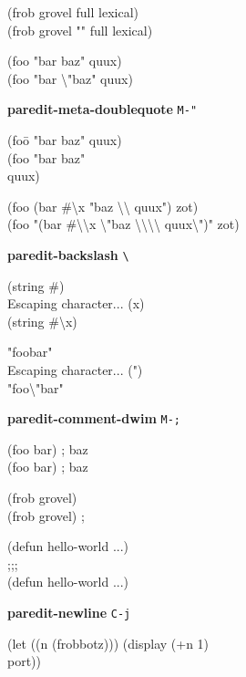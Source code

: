 \documentclass[10pt,landscape,a4paper]{article}
\newenvironment{nstabbing}
  {\setlength{\topsep}{-\parskip}%
   \setlength{\partopsep}{0.2em}%
   \tabbing}
  {\endtabbing}
\begin{document}
\begin{multicols}{4}
{\ttfamily
(frob grovel \cursor full lexical)\\
(frob grovel "\cursor " full lexical)

(foo "bar \cursor baz" quux)\\
(foo "bar \textbackslash"\cursor baz" quux)
}

\textbf{paredit-meta-doublequote} \texttt{M-"}

{\ttfamily
\begin{nstabbing}
(foo\={} "bar \cursor baz" quux)\\
(foo "bar baz"\\
\>\cursor quux)
\end{nstabbing}

(foo \cursor(bar \#\textbackslash x "baz \textbackslash\textbackslash{} quux") zot)\\
(foo "\cursor(bar \#\textbackslash\textbackslash x \textbackslash"baz \textbackslash\textbackslash\textbackslash\textbackslash{} quux\textbackslash")" zot)
}

\textbf{paredit-backslash} \texttt{\textbackslash}

{\ttfamily
(string \#\cursor)\\
Escaping character... (x)\\
(string \#\textbackslash x\cursor)

"foo\cursor bar"\\
Escaping character... (")\\
"foo\textbackslash"\cursor bar"
}

\textbf{paredit-comment-dwim} \texttt{M-;}

{\ttfamily
\begin{nstabbing}
(foo \cursor bar) \space ; baz \space \space \space \space \=\\
(foo bar) \>; \cursor baz
\end{nstabbing}

\begin{nstabbing}
(frob grovel)\cursor \space \space \space \space \space \space \space \space\=\\
(frob grovel) \>;\cursor
\end{nstabbing}

\cursor(defun hello-world ...)\\
;;; \cursor\\
(defun hello-world ...)
}

\textbf{paredit-newline} \texttt{C-j}

{\ttfamily
\begin{nstabbing}
(let ((n (frobbotz))) \cursor (display (+n 1)\\
port))
\end{nstabbing}

}
\end{multicols}
\end{document}
